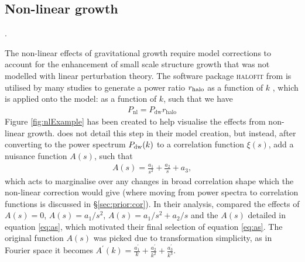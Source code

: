 \documentclass[titlesmallcaps, examinerscopy, copyrightpage]{uqthesis}
\newcommand{\halofit}{\textsc{halofit}}
\begin{document}
\subsection{Non-linear growth}\label{sec:nonlinear}.

The non-linear effects of gravitational growth require model corrections to account for the enhancement of small scale structure growth that was not modelled with linear perturbation theory. The software package \halofit{} from \citet{Smith2003} is utilised by many studies to generate a power ratio $r_{\rm{halo}}$ as a function of $k$ \citep{ReidPercival2010, BlakeDavis2011, ChuangWang2012}, which is applied onto the model:
 as a function of $k$, such that we have
\begin{align}
P_{\text{nl}} = P_{\text{dw}} r_{\text{halo}}
\end{align}
Figure \ref{fig:nlExample} has been created to help visualise the effects from non-linear growth. \citet{XuPadmanabhan2012} does not detail this step in their model creation, but instead, after converting to the power spectrum $P_{\rm{dw}}(k)$ to a correlation function $\xi(s)$, add a nuisance function $A(s)$, such that
\begin{align} \label{eq:as}
A(s) = \frac{a_1}{s^2} + \frac{a_2}{s} + a_3,
\end{align}
which acts to marginalise over any changes in broad correlation shape which the non-linear correction would give (where moving from power spectra to correlation functions is discussed in \S\ref{sec:prior:cor}). In their analysis, \citet{XuPadmanabhan2012} compared the effects of $A(s) = 0$, $A(s) = a_1 / s^2$, $A(s) = a_1 / s^2 + a_2 / s$ and the $A(s)$ detailed in equation \eqref{eq:as}, which motivated their final selection of equation \eqref{eq:as}. The original function $A(s)$ was picked due to transformation simplicity, as in Fourier space it becomes $A^\prime(k) = \frac{a^\prime_1}{k} + \frac{a^\prime_2}{k^2} + \frac{a^\prime_3}{k^3}$.
\end{document}
